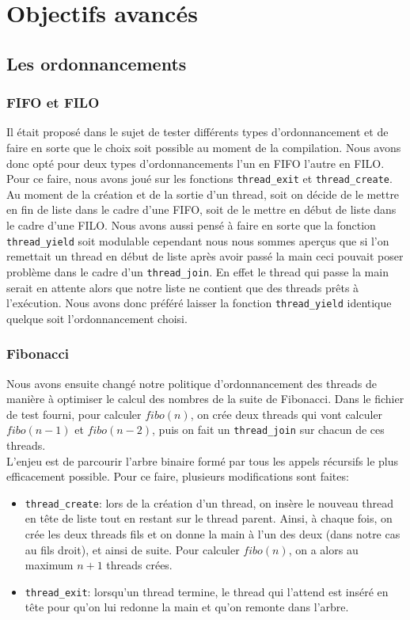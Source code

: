 \section{Objectifs avancés}

\subsection{Les ordonnancements}

\subsubsection{FIFO et FILO}
Il était proposé dans le sujet de tester différents types d'ordonnancement et de faire en sorte que le choix soit possible au moment de la compilation. Nous avons donc opté pour deux types d'ordonnancements l'un en FIFO l'autre en FILO. Pour ce faire, nous avons joué sur les fonctions \texttt{thread\_exit} et \texttt{thread\_create}. Au moment de la création et de la sortie d'un thread, soit on décide de le mettre en fin de liste dans le cadre d'une FIFO, soit de le mettre en début de liste dans le cadre d'une FILO. Nous avons aussi pensé à faire en sorte que la fonction \texttt{thread\_yield} soit modulable cependant nous nous sommes aperçus que si l'on remettait un thread en début de liste après avoir passé la main ceci pouvait poser problème dans le cadre d'un \texttt{thread\_join}. En effet le thread qui passe la main serait en attente alors que notre liste ne contient que des threads pr\^ets à l'exécution. Nous avons donc préféré laisser la fonction \texttt{thread\_yield} identique quelque soit l'ordonnancement choisi.


\subsubsection{Fibonacci}

Nous avons ensuite changé notre politique d'ordonnancement des threads de manière à optimiser le calcul des nombres de la suite de Fibonacci. Dans le fichier de test fourni, pour calculer $fibo(n)$, on crée deux threads qui vont calculer $fibo(n-1)$ et $fibo(n-2)$, puis on fait un \texttt{thread\_join} sur chacun de ces threads.\\
L'enjeu est de parcourir l'arbre binaire formé par tous les appels récursifs le plus efficacement possible. Pour ce faire, plusieurs modifications sont faites:
\begin{itemize}
\item \texttt{thread\_create}: lors de la création d'un thread, on insère le nouveau thread en tête de liste tout en restant sur le thread parent. Ainsi, à chaque fois, on crée les deux threads fils et on donne la main à l'un des deux (dans notre cas au fils droit), et ainsi de suite. Pour calculer $fibo(n)$, on a alors au maximum $n+1$ threads crées.
\item \texttt{thread\_exit}: lorsqu'un thread termine, le thread qui l'attend est inséré en tête pour qu'on lui redonne la main et qu'on remonte dans l'arbre.
\end{itemize}

